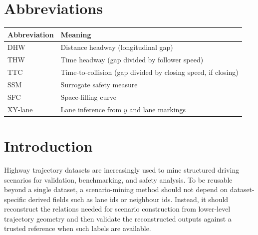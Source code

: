 \documentclass[12pt,a4paper,twoside,openright]{report}
\begin{document}
    \cleardoublepage
    \tableofcontents

    \cleardoublepage
    \listoffigures

    \cleardoublepage
    \listoftables

    \cleardoublepage
    \chapter*{Abbreviations}

    \begin{tabular}{@{}ll@{}}
        \toprule
        Abbreviation & Meaning \\
        \midrule
        DHW & Distance headway (longitudinal gap) \\
        THW & Time headway (gap divided by follower speed) \\
        TTC & Time-to-collision (gap divided by closing speed, if closing) \\
        SSM & Surrogate safety measure \\
        SFC & Space-filling curve \\
        XY-lane & Lane inference from $y$ and lane markings \\
        \bottomrule
    \end{tabular}

    \cleardoublepage
    \setcounter{page}{1}
    \onehalfspacing

    \chapter{Introduction}
    \label{chap:introduction}

    Highway trajectory datasets are increasingly used to mine structured driving scenarios for validation, benchmarking, and safety analysis. To be reusable beyond a single dataset, a scenario-mining method should not depend on dataset-specific derived fields such as lane ids or neighbour ids. Instead, it should reconstruct the relations needed for scenario construction from lower-level trajectory geometry and then validate the reconstructed outputs against a trusted reference when such labels are available.
\end{document}
